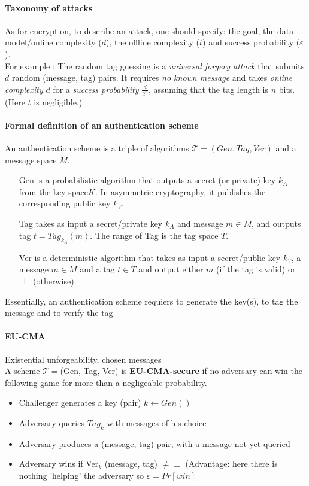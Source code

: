 \documentclass[11pt,a4paper]{report}
\begin{document}
\paragraph{Taxonomy of attacks}
As for encryption, to describe an attack, one should specify: the goal,
the data model/online complexity ($d$), 
the offline complexity ($t$) and success probability ($\varepsilon$).\\
For example : The random tag guessing is a \emph{universal forgery attack} that submits $d$ random (message, tag) pairs. It requires \emph{no known message} and takes \emph{online complexity} $d$ for a \emph{success probability} $\frac{d}{2^n}$, assuming that the tag length is $n$ bits. (Here $t$ is negligible.)

\paragraph{Formal definition of an authentication scheme}
An authentication scheme is a triple of algorithms $\mathcal{T} =(Gen,Tag,Ver)$ and a message space $M$.
\begin{itemize}
\item[Gen] is a probabilistic algorithm that outputs a secret (or private) key $k_A$ from the key space$K$. In asymmetric cryptography, it publishes the corresponding public key $k_V$.
\item[Tag] takes as input a secret/private key $k_A$ and message $m \in M$, and outputs tag $t = Tag_{k_A} (m)$. The range of Tag is the tag space $T$.
\item[Ver] is a deterministic algorithm that takes as input a secret/public key $k_V$, a message $m \in M$ and a tag $t \in T$ and output either $m$ (if the tag is valid) or $\perp$ (otherwise).
\end{itemize}
Essentially, an authentication scheme requiers to generate the key(s), to tag the message and to verify the tag
\vspace{-2mm}
\paragraph{EU-CMA} Existential unforgeability, chosen messages\\
A scheme $\mathcal{T} = $(Gen, Tag, Ver) is \textbf{EU-CMA-secure} if no adversary can win the following game for more than a negligeable probability.
\begin{itemize}
\item Challenger generates a key (pair) $k \leftarrow Gen()$
\item Adversary queries $Tag_k$ with messages of his choice
\item Adversary produces a (message, tag) pair, with a message not yet queried
\item Adversary wins if Ver$_k$ (message, tag) $\neq \perp$ (Advantage: here there is nothing 'helping' the adversary so $\varepsilon = Pr[win]$
\end{itemize}
\vspace{2mm}
\end{document}
